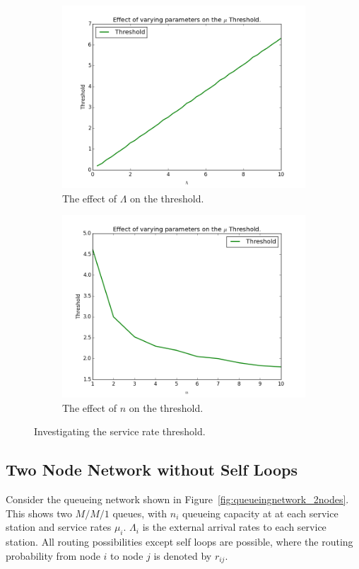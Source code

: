 \documentclass{article}
\begin{document}
\begin{figure}[!htbp]
\begin{subfigure}[b]{0.5\textwidth}
    \includegraphics[width=\textwidth]{images/plot_thresholds_L}
    \caption{The effect of $\Lambda$ on the threshold.}
    \label{fig:threshold_L}
  \end{subfigure}
  \begin{subfigure}[b]{0.5\textwidth}
    \includegraphics[width=\textwidth]{images/plot_thresholds_n}
    \caption{The effect of $n$ on the threshold.}
    \label{fig:threshold_n}
  \end{subfigure}
  \caption{Investigating the service rate threshold.}
  \label{fig:threshold_investigate}
\end{figure}

\subsection{Two Node Network without Self Loops}\label{sec:2nodewithoutselfloops}
Consider the queueing network shown in Figure~\ref{fig:queueingnetwork_2nodes}.
This shows two \(M/M/1\) queues, with \(n_i\) queueing capacity at at each service station and service rates $\mu_i$.
$\Lambda_i$ is the external arrival rates to each service station.
All routing possibilities except self loops are possible, where the routing probability from node $i$ to node $j$ is denoted by $r_{ij}$.
\end{document}
